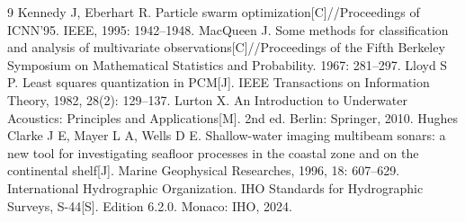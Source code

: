 \documentclass[withoutpreface,notoc]{cumcmthesis}
\begin{document}
{
\begin{thebibliography}{9}
 Kennedy J, Eberhart R. Particle swarm optimization[C]//Proceedings of ICNN'95. IEEE, 1995: 1942--1948.
 MacQueen J. Some methods for classification and analysis of multivariate observations[C]//Proceedings of the Fifth Berkeley Symposium on Mathematical Statistics and Probability. 1967: 281--297.
 Lloyd S P. Least squares quantization in PCM[J]. IEEE Transactions on Information Theory, 1982, 28(2): 129--137.
 Lurton X. An Introduction to Underwater Acoustics: Principles and Applications[M]. 2nd ed. Berlin: Springer, 2010.
 Hughes Clarke J E, Mayer L A, Wells D E. Shallow-water imaging multibeam sonars: a new tool for investigating seafloor processes in the coastal zone and on the continental shelf[J]. Marine Geophysical Researches, 1996, 18: 607--629.
 International Hydrographic Organization. IHO Standards for Hydrographic Surveys, S-44[S]. Edition 6.2.0. Monaco: IHO, 2024.
\end{thebibliography}
}
\end{document}
